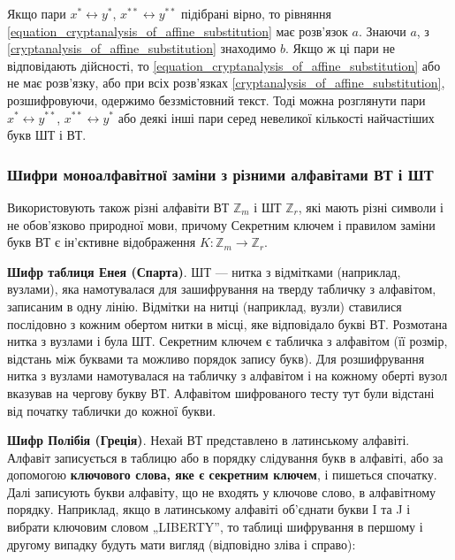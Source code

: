 Якщо пари $x^{*} \leftrightarrow y^{*}$, $x^{**} \leftrightarrow y^{**}$
підібрані вірно, то рівняння \ref{equation_cryptanalysis_of_affine_substitution} має
розв’язок $a$. Знаючи $a$, з \ref{cryptanalysis_of_affine_substitution} знаходимо
$b$. Якщо ж ці пари не відповідають дійсності, то
\ref{equation_cryptanalysis_of_affine_substitution} або не має
розв’язку, або при всіх розв’язках \ref{cryptanalysis_of_affine_substitution}, 
розшифровуючи, одержимо беззмістовний текст. Тоді можна розглянути
пари $x^{*} \leftrightarrow y^{**}$, $x^{**} \leftrightarrow y^{*}$
або деякі інші пари серед невеликої кількості найчастіших букв ШТ і ВТ.

\subsubsection{Шифри моноалфавітної заміни з різними алфавітами ВТ і ШТ}

Використовують також різні алфавіти ВТ $\mathbb{Z}_m$ і ШТ $\mathbb{Z}_r$, які мають різні
символи і не обов’язково природної мови, причому Секретним ключем
і правилом заміни букв ВТ є ін’єктивне відображення $K: \mathbb{Z}_m \rightarrow \mathbb{Z}_r$.

\textbf{Шифр таблиця Енея (Спарта)}. ШТ --- нитка з відмітками (наприклад,
вузлами), яка намотувалася для зашифрування на тверду табличку з алфавітом,
записаним в одну лінію. Відмітки на нитці (наприклад, вузли) ставилися
послідовно з кожним обертом нитки в місці, яке відповідало букві ВТ.
Розмотана нитка з вузлами і була ШТ. Секретним ключем є табличка з
алфавітом (її розмір, відстань між буквами та можливо порядок запису букв).
Для розшифрування нитка з вузлами намотувалася на табличку з алфавітом і
на кожному оберті вузол вказував на чергову букву ВТ. Алфавітом
шифрованого тесту тут були відстані від початку таблички до кожної букви.

\textbf{Шифр Полібія (Греція)}. Нехай ВТ представлено в латинському
алфавіті. Алфавіт записується в таблицю або в порядку слідування букв в
алфавіті, або за допомогою \textbf{ключового слова, яке є секретним ключем},
і пишеться спочатку. Далі записують букви алфавіту, що не входять у ключове
слово, в алфавітному порядку. Наприклад, якщо в латинському алфавіті
об’єднати букви I та J і вибрати ключовим словом „LIBERTY”, то таблиці
шифрування в першому і другому випадку будуть мати вигляд (відповідно
зліва і справо):


